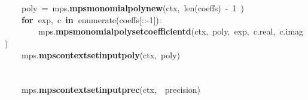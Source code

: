 \documentclass{article}\usepackage[]{graphicx}\usepackage[dvipsnames,table]{xcolor}
\makeatletter
\newcommand{\hlnum}[1]{\textcolor[rgb]{0.686,0.059,0.569}{#1}}%
\newcommand{\hlopt}[1]{\textcolor[rgb]{0,0,0}{#1}}%
\newcommand{\hldef}[1]{\textcolor[rgb]{0.345,0.345,0.345}{#1}}%
\newcommand{\hlkwa}[1]{\textcolor[rgb]{0.161,0.373,0.58}{\textbf{#1}}}%
\newcommand{\hlkwb}[1]{\textcolor[rgb]{0.69,0.353,0.396}{#1}}%
\newcommand{\hlkwd}[1]{\textcolor[rgb]{0.737,0.353,0.396}{\textbf{#1}}}%
\newenvironment{kframe}{%
 \def\at@end@of@kframe{}%
 \ifinner\ifhmode%
  \def\at@end@of@kframe{\end{minipage}}%
  \begin{minipage}{\columnwidth}%
 \fi\fi%
 \def\FrameCommand##1{\hskip\@totalleftmargin \hskip-\fboxsep
 \colorbox{shadecolor}{##1}\hskip-\fboxsep
     \hskip-\linewidth \hskip-\@totalleftmargin \hskip\columnwidth}%
 \MakeFramed {\advance\hsize-\width
   \@totalleftmargin\z@ \linewidth\hsize
   \@setminipage}}%
 {\par\unskip\endMakeFramed%
 \at@end@of@kframe}
\newenvironment{knitrout}{}{} %
\makeatother
\begin{document}
\begin{center}
\begin{minipage}[m]{18cm}
\begin{knitrout}
\begin{kframe}
\hldef{}\hspace*{\fill}\\
\hldef{}\hldef{\ \ \ \ }\hldef{}\hspace*{\fill}\\
\hldef{}\hldef{\ \ \ \ }\hldef{poly\ }\hlopt{=\ }\hldef{\textunderscore mps}\hlopt{.}\hldef{}\hlkwd{mps\textunderscore monomial\textunderscore poly\textunderscore new}\hldef{}\hlopt{(}\hldef{ctx}\hlopt{,\ }\hldef{}\hlkwb{len}\hldef{}\hlopt{(}\hldef{coeffs}\hlopt{)\ {-}\ }\hldef{}\hlnum{1\ }\hldef{}\hlopt{)}\hspace*{\fill}\\
\hldef{}\hldef{\ \ \ \ }\hldef{}\hlkwa{for\ }\hldef{exp}\hlopt{,\ }\hldef{c\ }\hlkwa{in\ }\hldef{}\hlkwb{enumerate}\hldef{}\hlopt{(}\hldef{coeffs}\hlopt{{[}::{-}}\hldef{}\hlnum{1}\hldef{}\hlopt{{]}):\ }\hldef{}\hspace*{\fill}\\
\hldef{}\hldef{\ \ \ \ \ \ \ \ }\hldef{\textunderscore mps}\hlopt{.}\hldef{}\hlkwd{mps\textunderscore monomial\textunderscore poly\textunderscore set\textunderscore coefficient\textunderscore d}\hldef{}\hlopt{(}\hldef{ctx}\hlopt{,\ }\hldef{poly}\hlopt{,\ }\hldef{exp}\hlopt{,\ }\hldef{c}\hlopt{.}\hldef{real}\hlopt{,\ }\hldef{c}\hlopt{.}\hldef{imag}\hlopt{)}\hspace*{\fill}\\
\hldef{}\hldef{\ \ \ \ }\hldef{\textunderscore mps}\hlopt{.}\hldef{}\hlkwd{mps\textunderscore context\textunderscore set\textunderscore input\textunderscore poly}\hldef{}\hlopt{(}\hldef{ctx}\hlopt{,\ }\hldef{poly}\hlopt{)}\hspace*{\fill}\\
\hldef{}\hspace*{\fill}\\
\hldef{}\hldef{\ \ \ \ }\hldef{}\hspace*{\fill}\\
\hldef{}\hldef{\ \ \ \ }\hldef{\textunderscore mps}\hlopt{.}\hldef{}\hlkwd{mps\textunderscore context\textunderscore set\textunderscore input\textunderscore prec}\hldef{}\hlopt{(}\hldef{ctx}\hlopt{,}\hldef{\ \ }\hlopt{}\hldef{precision}\hlopt{)}\hspace*{\fill}\\
\hldef{}\hspace*{\fill}\\
\hldef{}\hldef{\ \ \ \ }\hldef{}\hspace*{\fill}\\

\end{kframe}
\end{knitrout}
\end{minipage}
\end{center}
\end{document}
